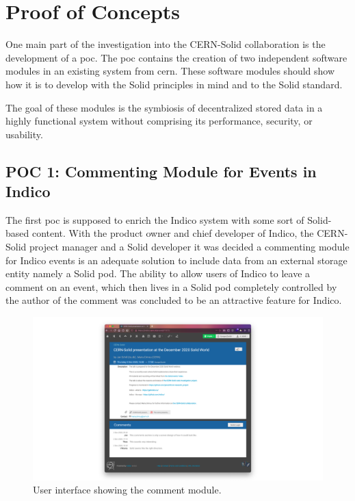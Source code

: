 \section{Proof of Concepts}

One main part of the investigation into the CERN-Solid collaboration is the development of a \gls{poc}. The \gls{poc} contains the creation of two independent software modules in an existing system from \gls{cern}. These software modules should show how it is to develop with the Solid principles in mind and to the Solid standard.

The goal of these modules is the symbiosis of decentralized stored data in a highly functional system without comprising its performance, security, or usability.

\subsection{POC 1: Commenting Module for Events in Indico}

The first \gls{poc} is supposed to enrich the Indico system with some sort of Solid-based content. With the product owner and chief developer of Indico, the CERN-Solid project manager and a Solid developer it was decided a commenting module for Indico events is an adequate solution to include data from an external storage entity namely a Solid pod. The ability to allow users of Indico to leave a comment on an event, which then lives in a Solid pod completely controlled by the author of the comment was concluded to be an attractive feature for Indico.

\begin{figure}
    \centering
    \includegraphics[width=1\textwidth]{prototype/screen_design/indico-comments-screen_design.png}
    \caption{User interface showing the comment module.}
    \label{fig:indico-comments-screen_design}
\end{figure}

